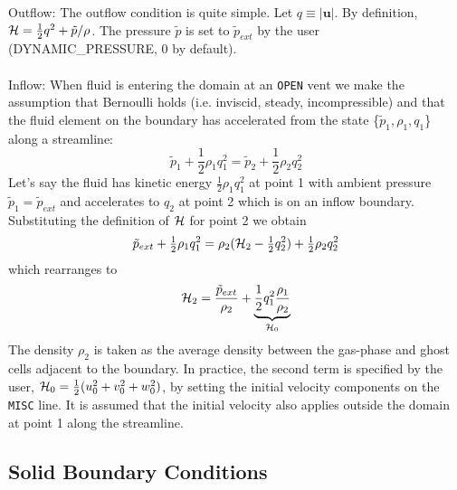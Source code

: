 Outflow: The outflow condition is quite simple.
Let $q \equiv |\mathbf{u}|$. By definition, ${\cal H} = \frac{1}{2}q^2 + \tilde{p}/\rho$.
The pressure $\tilde{p}$ is set to $\tilde{p}_{ext}$ by the user ({\ct DYNAMIC\_PRESSURE}, 0 by default).
\\
\\
Inflow: When fluid is entering the domain at an {\tt OPEN} vent we make the assumption that
Bernoulli holds (i.e. inviscid, steady, incompressible) and that the fluid element on the boundary has
accelerated from the state \{$\tilde{p}_1,\rho_1,q_1$\} along a streamline:
\begin{equation}
\tilde{p}_1 + \mbox{$\frac{1}{2}$}\rho_1 q_1^2 = \tilde{p}_2 + \mbox{$\frac{1}{2}$}\rho_2 q_2^2
\end{equation}
Let's say the fluid has kinetic energy $\frac{1}{2}\rho_1 q_1^2$ at point 1 with
ambient pressure $\tilde{p}_1 = \tilde{p}_{ext}$ and accelerates to $q_2$ at point 2 which is on an inflow boundary.
Substituting the definition of ${\cal H}$ for point 2 we obtain
\begin{equation}
\tilde{p}_{ext} + \mbox{$\frac{1}{2}$}\rho_1 q_1^2 = \rho_2({\cal H}_2 - \mbox{$\frac{1}{2}$} q_2^2) +
\mbox{$\frac{1}{2}$} \rho_2 q_2^2
\end{equation}
which rearranges to
\begin{equation}
{\cal H}_2 = \frac{\tilde{p}_{ext}}{\rho_2} + \underbrace{\frac{1}{2}q_1^2 \frac{\rho_1}{\rho_2}}_{{\cal H}_0}
\end{equation}
The density $\rho_2$ is taken as the average density between the gas-phase and ghost cells adjacent to the boundary. In practice, the second term is specified by the user, ${\cal H}_0 = \frac{1}{2}(u_0^2 + v_0^2 + w_0^2)$, by setting the initial velocity components on the {\tt MISC} line.  It is assumed that the initial velocity also applies outside the domain at point 1 along the streamline.



\subsection{Solid Boundary Conditions}

